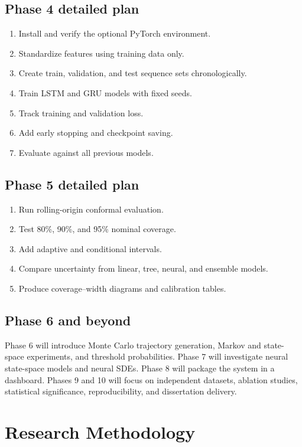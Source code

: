 \documentclass[11pt,a4paper]{report}
\begin{document}
\section{Phase 4 detailed plan}
\begin{enumerate}[leftmargin=*]
\item Install and verify the optional PyTorch environment.
\item Standardize features using training data only.
\item Create train, validation, and test sequence sets chronologically.
\item Train LSTM and GRU models with fixed seeds.
\item Track training and validation loss.
\item Add early stopping and checkpoint saving.
\item Evaluate against all previous models.
\end{enumerate}

\section{Phase 5 detailed plan}
\begin{enumerate}[leftmargin=*]
\item Run rolling-origin conformal evaluation.
\item Test 80\%, 90\%, and 95\% nominal coverage.
\item Add adaptive and conditional intervals.
\item Compare uncertainty from linear, tree, neural, and ensemble models.
\item Produce coverage--width diagrams and calibration tables.
\end{enumerate}

\section{Phase 6 and beyond}
Phase 6 will introduce Monte Carlo trajectory generation, Markov and state-space experiments, and threshold probabilities. Phase 7 will investigate neural state-space models and neural SDEs. Phase 8 will package the system in a dashboard. Phases 9 and 10 will focus on independent datasets, ablation studies, statistical significance, reproducibility, and dissertation delivery.

\chapter{Research Methodology}
\end{document}
